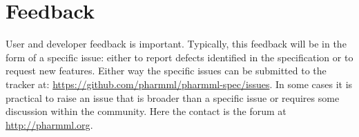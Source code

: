 \section{Feedback} 

User and developer feedback is important. Typically,
this feedback will be in the form of a specific issue: either to report defects identified in
the specification or to request new features. Either way the specific issues can be submitted
to the tracker at: \url{https://github.com/pharmml/pharmml-spec/issues}. In some cases it is practical to raise
an issue that is broader than a specific issue or requires some discussion within the community. 
Here the contact is the \pharmml forum at \url{http://pharmml.org}.
